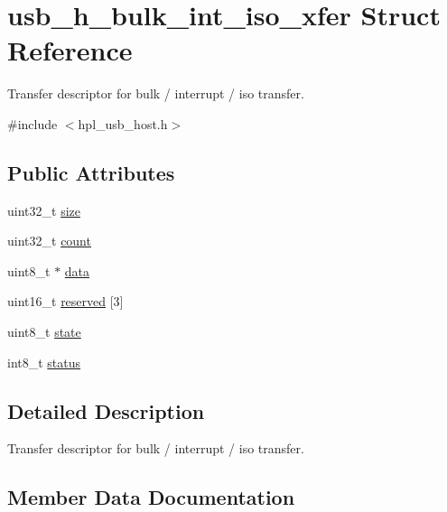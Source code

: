 \hypertarget{structusb__h__bulk__int__iso__xfer}{}\section{usb\+\_\+h\+\_\+bulk\+\_\+int\+\_\+iso\+\_\+xfer Struct Reference}
\label{structusb__h__bulk__int__iso__xfer}


Transfer descriptor for bulk / interrupt / iso transfer.  




{\ttfamily \#include $<$hpl\+\_\+usb\+\_\+host.\+h$>$}

\subsection*{Public Attributes}
\begin{DoxyCompactItemize}
\item 
uint32\+\_\+t \hyperlink{structusb__h__bulk__int__iso__xfer_a7590b4990716b8eed87caa68e6326c9d}{size}
\item 
uint32\+\_\+t \hyperlink{structusb__h__bulk__int__iso__xfer_ae4c487e94a10021d3949a4bae473b14f}{count}
\item 
uint8\+\_\+t $\ast$ \hyperlink{structusb__h__bulk__int__iso__xfer_a2cd40e9acd33e63196293e729b0cc1d9}{data}
\item 
uint16\+\_\+t \hyperlink{structusb__h__bulk__int__iso__xfer_a53c976fbf878f90360f4578bb8115586}{reserved} \mbox{[}3\mbox{]}
\item 
uint8\+\_\+t \hyperlink{structusb__h__bulk__int__iso__xfer_aa3c8909b83fbdcdcbea100f9a0e02869}{state}
\item 
int8\+\_\+t \hyperlink{structusb__h__bulk__int__iso__xfer_ae8a38b9a45fbbdde1cf6ebcc82c255db}{status}
\end{DoxyCompactItemize}


\subsection{Detailed Description}
Transfer descriptor for bulk / interrupt / iso transfer. 

\subsection{Member Data Documentation}
\mbox{\label{structusb__h__bulk__int__iso__xfer_ae4c487e94a10021d3949a4bae473b14f}} 
